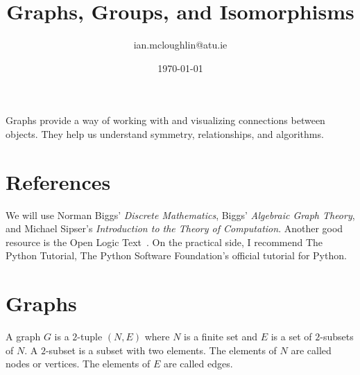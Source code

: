 \documentclass{iansnotes}
\title{Graphs, Groups, and Isomorphisms}
\author{ian.mcloughlin@atu.ie}
\date{\today}
\begin{document}
\maketitle

\begin{center}
\end{center}

Graphs provide a way of working with and visualizing connections between objects.
They help us understand symmetry, relationships, and algorithms.

\section{References}
  We will use Norman Biggs' \emph{Discrete Mathematics}\autocite{biggs}, Biggs' \emph{Algebraic Graph Theory}\autocite{biggs_1974}, and Michael Sipser's \emph{Introduction to the Theory of Computation}\autocite{sipser}.
  Another good resource is the Open Logic Text~\autocite{openlogictext}.
  On the practical side, I recommend The Python Tutorial\autocite{pythontutorial}, The Python Software Foundation's official tutorial for Python.


\section{Graphs} 
  A graph $G$ is a $2$-tuple $(N, E)$ where $N$ is a finite set and $E$ is a set of $2$-subsets of $N$.
  A $2$-subset is a subset with two elements.
  The elements of $N$ are called nodes or vertices.
  The elements of $E$ are called edges.
\end{document}
